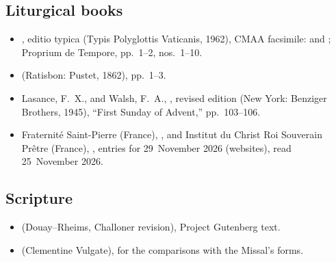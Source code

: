 {\small
\subsection*{Liturgical books}
\begin{itemize}[leftmargin=1.2em,itemsep=.25em]
\item {}, editio typica (Typis
Polyglottis Vaticanis, 1962), CMAA facsimile:  and
; Proprium de Tempore, pp.~1--2,
nos.~1--10.
\item {} (Ratisbon: Pustet, 1862), pp.~1--3.
\item Lasance, F.~X., and Walsh, F.~A., , revised edition (New York: Benziger Brothers, 1945), ``First Sunday
of Advent,'' pp.~103--106.
\item Fraternité Saint-Pierre (France), , and Institut du
Christ Roi Souverain Prêtre (France), , entries for 29~November
2026 (websites), read 25~November 2026.
\end{itemize}

\subsection*{Scripture}
\begin{itemize}[leftmargin=1.2em,itemsep=.25em]
\item {} (Douay--Rheims,
Challoner revision), Project Gutenberg text.
\item {} (Clementine Vulgate), for the
comparisons with the Missal's forms.
\end{itemize}

}
